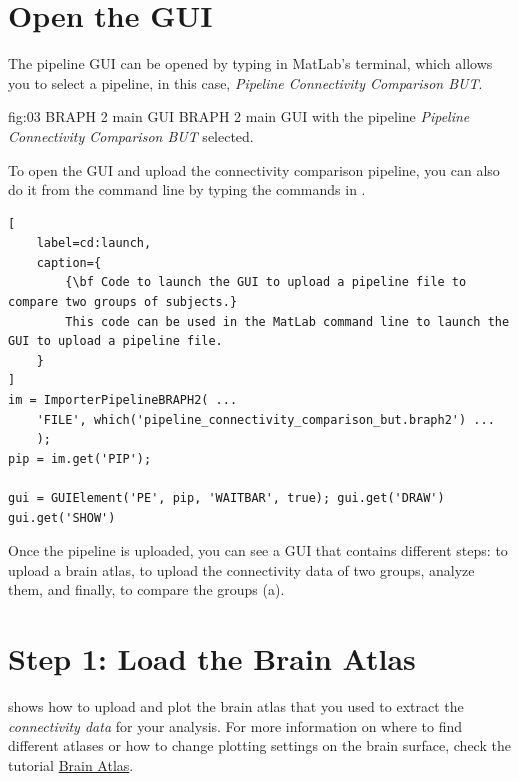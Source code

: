 \documentclass[justified]{tufte-handout}
\begin{document}
\section{Open the GUI}

The pipeline GUI can be opened by typing  in MatLab's terminal, which allows you to select a pipeline, in this case, \emph{Pipeline Connectivity Comparison BUT}.

	{fig:03}
	{
	}
	{BRAPH 2 main GUI}
	{
	BRAPH 2 main GUI with the pipeline \emph{Pipeline Connectivity Comparison BUT} selected.
	}

\begin{tcolorbox}[
	title=Pipeline launch from command line
]
To open the GUI and upload the connectivity comparison pipeline, you can also do it from the command line by typing the commands in .
%
\begin{lstlisting}[
	label=cd:launch,
	caption={
		{\bf Code to launch the GUI to upload a pipeline file to compare two groups of subjects.}
		This code can be used in the MatLab command line to launch the GUI to upload a pipeline file.
	}
]
im = ImporterPipelineBRAPH2( ...
	'FILE', which('pipeline_connectivity_comparison_but.braph2') ...
	);
pip = im.get('PIP');

gui = GUIElement('PE', pip, 'WAITBAR', true); gui.get('DRAW')
gui.get('SHOW')
\end{lstlisting}
\end{tcolorbox}

Once the pipeline is uploaded, you can see a GUI that contains different steps: to upload a brain atlas, to upload the connectivity data of two groups, analyze them, and finally, to compare the groups (a). 

\section{Step 1: Load the Brain Atlas}

 shows how to upload and plot the brain atlas that you used to extract the \emph{connectivity data} for your analysis. For more information on where to find different atlases or how to change plotting settings on the brain surface, check the tutorial \href{https://github.com/softmatterlab/BRAPH-2-Matlab/tree/develop/tutorials/general/tut_ba}{Brain Atlas}.
\end{document}
